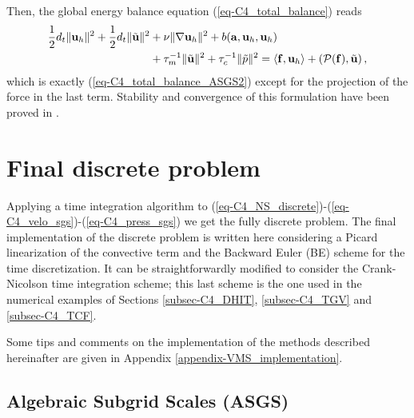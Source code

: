 Then, the global energy balance equation (\ref{eq-C4_total_balance}) reads
\begin{align}
\label{eq-C4_total_balance_OSS2}
\frac{1}{2}d_t\|\u_h\|^2+\frac{1}{2}d_t\|\tilde{\u}\|^2
&+\nu\|\nabla\u_h\|^2+b(\a,\u_h,\u_h) \\ \nonumber
&+\tau_m^{-1}\|\tilde{\u}\|^2+\tau_c^{-1}\|\tilde{p}\|^2 %
=\left<\mathbf{f},\mathbf{u}_h\right>+\left(\mathcal{P}(\mathbf{f}),\tilde{\u}\right),
\end{align}
which is exactly (\ref{eq-C4_total_balance_ASGS2}) except for the projection of the force in the last term. Stability and convergence of this formulation have been proved in \cite{Badia2010,badia_convergence_2014}.

\section{Final discrete problem}
\label{sec-C4_discrete}
Applying a time integration algorithm to (\ref{eq-C4_NS_discrete})-(\ref{eq-C4_velo_sgs})-(\ref{eq-C4_press_sgs}) we get the fully discrete problem. The final implementation of the discrete problem is written here considering a Picard linearization of the convective term and the Backward Euler (BE) scheme for the time discretization. It can be straightforwardly modified to consider the Crank-Nicolson time integration scheme; this last scheme is the one used in the numerical examples of Sections \ref{subsec-C4_DHIT},  \ref{subsec-C4_TGV} and \ref{subsec-C4_TCF}.

Some tips and comments on the implementation of the methods described hereinafter are given in Appendix \ref{appendix-VMS_implementation}.

\subsection{Algebraic Subgrid Scales (ASGS)}


